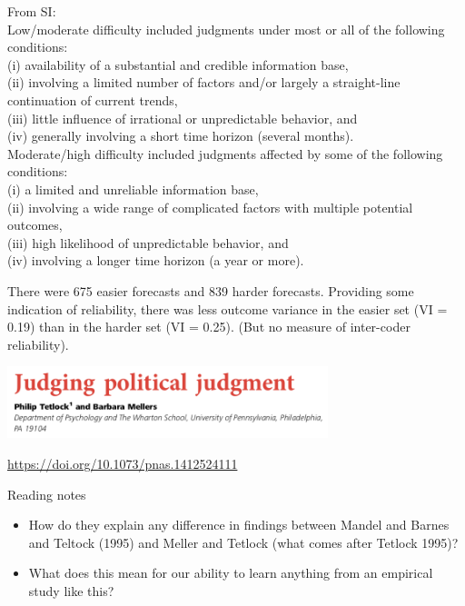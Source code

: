 \documentclass{beamer}
\begin{document}
\begin{frame}

From SI:\\
Low/moderate difficulty included judgments under most or all of the following conditions: \\
(i) availability of a substantial and credible information base, \\
(ii) involving a limited number of factors and/or largely a straight-line continuation of current trends, \\
(iii) little influence of irrational or unpredictable behavior, and \\
(iv) generally involving a short time horizon (several months).\\

Moderate/high difficulty included judgments affected by some of the following conditions: \\
(i) a limited and unreliable information base, \\
(ii) involving a wide range of complicated factors with multiple potential outcomes, \\
(iii) high likelihood of unpredictable behavior, and \\
(iv) involving a longer time horizon (a year or more).

There were 675 easier forecasts and 839 harder forecasts. Providing some indication of reliability, there was less outcome variance in the easier set (VI = 0.19) than in the harder set (VI = 0.25). (But no measure of inter-coder reliability).

\end{frame}
\begin{frame}

\begin{center}
\includegraphics[width=0.7\textwidth]{figures/tetlock_judging_2014_title}
\end{center}

\vfill
\url{https://doi.org/10.1073/pnas.1412524111}

\end{frame}
\begin{frame}

Reading notes
\begin{itemize}
\item How do they explain any difference in findings between Mandel and Barnes and Teltock (1995) and Meller and Tetlock (what comes after Tetlock 1995)?
\item What does this mean for our ability to learn anything from an empirical study like this?
\end{itemize}

\end{frame}
\end{document}
